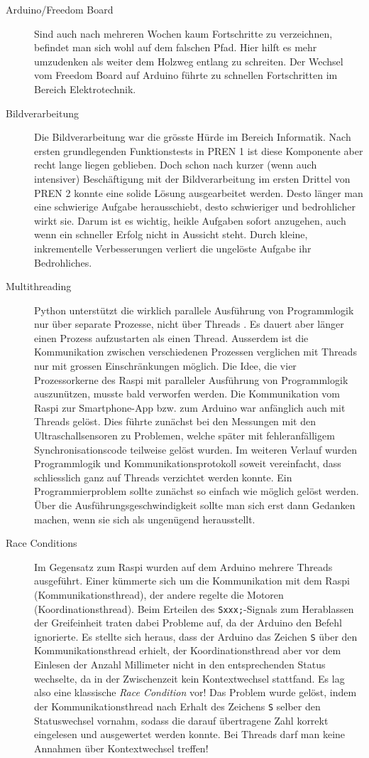 \begin{description}
    \item[Arduino/Freedom Board] Sind auch nach mehreren Wochen kaum Fortschritte zu verzeichnen, befindet man sich wohl auf dem falschen Pfad. Hier hilft es mehr umzudenken als weiter dem Holzweg entlang zu schreiten. Der Wechsel vom Freedom Board auf Arduino führte zu schnellen Fortschritten im Bereich Elektrotechnik.
    \item[Bildverarbeitung] Die Bildverarbeitung war die grösste Hürde im Bereich Informatik. Nach ersten grundlegenden Funktionstests in PREN 1 ist diese Komponente aber recht lange liegen geblieben. Doch schon nach kurzer (wenn auch intensiver) Beschäftigung mit der Bildverarbeitung im ersten Drittel von PREN 2 konnte eine solide Lösung ausgearbeitet werden. Desto länger man eine schwierige Aufgabe herausschiebt, desto schwieriger und bedrohlicher wirkt sie. Darum ist es wichtig, heikle Aufgaben sofort anzugehen, auch wenn ein schneller Erfolg nicht in Aussicht steht. Durch kleine, inkrementelle Verbesserungen verliert die ungelöste Aufgabe ihr Bedrohliches.
    \item[Multithreading] Python unterstützt die wirklich parallele Ausführung von Programmlogik nur über separate Prozesse, nicht über Threads \cite[S. 122]{effective-python}. Es dauert aber länger einen Prozess aufzustarten als einen Thread. Ausserdem ist die Kommunikation zwischen verschiedenen Prozessen verglichen mit Threads nur mit grossen Einschränkungen möglich. Die Idee, die vier Prozessorkerne des Raspi mit paralleler Ausführung von Programmlogik auszunützen, musste bald verworfen werden. Die Kommunikation vom Raspi zur Smartphone-App bzw. zum Arduino war anfänglich auch mit Threads gelöst. Dies führte zunächst bei den Messungen mit den Ultraschallsensoren zu Problemen, welche später mit fehleranfälligem Synchronisationscode teilweise gelöst wurden. Im weiteren Verlauf wurden Programmlogik und Kommunikationsprotokoll soweit vereinfacht, dass schliesslich ganz auf Threads verzichtet werden konnte. Ein Programmierproblem sollte zunächst so einfach wie möglich gelöst werden. Über die Ausführungsgeschwindigkeit sollte man sich erst dann Gedanken machen, wenn sie sich als ungenügend herausstellt.
    \item[Race Conditions] Im Gegensatz zum Raspi wurden auf dem Arduino mehrere Threads ausgeführt. Einer kümmerte sich um die Kommunikation mit dem Raspi (Kommunikationsthread), der andere regelte die Motoren (Koordinationsthread). Beim Erteilen des \texttt{Sxxx;}-Signals zum Herablassen der Greifeinheit traten dabei Probleme auf, da der Arduino den Befehl ignorierte. Es stellte sich heraus, dass der Arduino das Zeichen \texttt{S} über den Kommunikationsthread erhielt, der Koordinationsthread aber vor dem Einlesen der Anzahl Millimeter nicht in den entsprechenden Status wechselte, da in der Zwischenzeit kein Kontextwechsel stattfand. Es lag also eine klassische \textit{Race Condition} vor! Das Problem wurde gelöst, indem der Kommunikationsthread nach Erhalt des Zeichens \texttt{S} selber den Statuswechsel vornahm, sodass die darauf übertragene Zahl korrekt eingelesen und ausgewertet werden konnte. Bei Threads darf man keine Annahmen über Kontextwechsel treffen!

\end{description}
